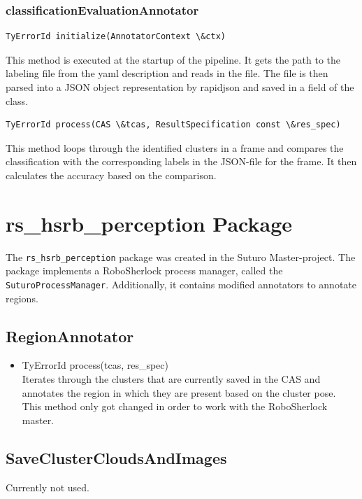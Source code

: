 \documentclass[main.tex]{subfiles}
\begin{document}
\subsubsection{classificationEvaluationAnnotator}
\begin{lstlisting}
TyErrorId initialize(AnnotatorContext \&ctx)
\end{lstlisting}

This method is executed at the startup of the pipeline.  It gets the path to the labeling file from the yaml description and reads in the file. The file is then parsed into a JSON object representation by rapidjson and saved in a field of the class.

\begin{lstlisting}
TyErrorId process(CAS \&tcas, ResultSpecification const \&res_spec)
\end{lstlisting}

This method loops through the identified clusters in a frame and compares the classification with the corresponding labels in the JSON-file for the frame. It then calculates the accuracy based on the comparison.



\section{rs\_hsrb\_perception Package}

The \texttt{rs\_hsrb\_perception} package was created in the Suturo Master-project. The package implements a RoboSherlock process manager, called the \texttt{SuturoProcessManager}. Additionally, it contains modified annotators to annotate regions.

\subsection{RegionAnnotator}
\begin{itemize}
\item TyErrorId process(tcas, res\_spec)\\
Iterates through the clusters that are currently saved in the CAS and annotates the region in which they are present based on the cluster pose.
This method only got changed in order to work with the RoboSherlock master.
\end{itemize}

\subsection{SaveClusterCloudsAndImages}
Currently not used.
\end{document}
